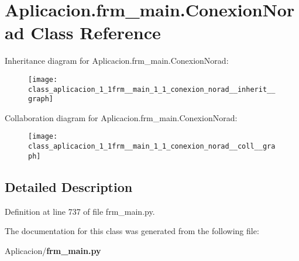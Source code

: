 \section{\-Aplicacion.\-frm\-\_\-main.\-Conexion\-Norad \-Class \-Reference}
\label{class_aplicacion_1_1frm__main_1_1_conexion_norad}


\-Inheritance diagram for \-Aplicacion.\-frm\-\_\-main.\-Conexion\-Norad\-:\nopagebreak
\begin{figure}[H]
\begin{center}
\leavevmode
\texttt{[image: class\_aplicacion\_1\_1frm\_\_main\_1\_1\_conexion\_norad\_\_inherit\_\_graph]}
\end{center}
\end{figure}


\-Collaboration diagram for \-Aplicacion.\-frm\-\_\-main.\-Conexion\-Norad\-:\nopagebreak
\begin{figure}[H]
\begin{center}
\leavevmode
\texttt{[image: class\_aplicacion\_1\_1frm\_\_main\_1\_1\_conexion\_norad\_\_coll\_\_graph]}
\end{center}
\end{figure}


\subsection{\-Detailed \-Description}


\-Definition at line 737 of file frm\-\_\-main.\-py.



\-The documentation for this class was generated from the following file\-:\begin{DoxyCompactItemize}
\item 
\-Aplicacion/{\bf frm\-\_\-main.\-py}\end{DoxyCompactItemize}
